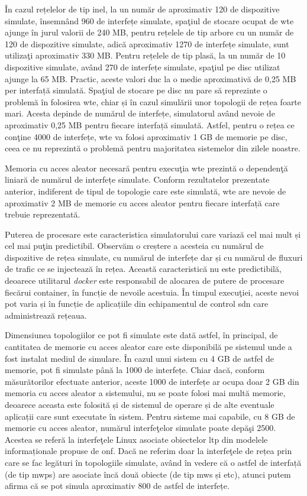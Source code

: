 În cazul rețelelor de tip inel, la un număr de aproximativ 120 de dispozitive simulate, însemnând 960 de interfețe simulate, spaţiul de stocare ocupat de \gls{wte} ajunge în jurul valorii de 240 MB, pentru rețelele de tip arbore cu un număr de 120 de dispozitive simulate, adică aproximativ 1270 de interfețe simulate, sunt utilizaţi aproximativ 330 MB. Pentru rețelele de tip plasă, la un număr de 10 dispozitive simulate, având 270 de interfețe simulate, spaţiul pe disc utilizat ajunge la 65 MB. Practic, aceste valori duc la o medie aproximativă de 0,25 MB per interfață simulată. Spaţiul de stocare pe disc nu pare să reprezinte o problemă în folosirea \gls{wte}, chiar și în cazul simulării unor topologii de rețea foarte mari. Acesta depinde de numărul de interfețe, simulatorul având nevoie de aproximativ 0,25 MB pentru fiecare interfață simulată. Astfel, pentru o rețea ce conţine 4000 de interfețe, \gls{wte} va folosi aproximativ 1 GB de memorie pe disc, ceea ce nu reprezintă o problemă pentru majoritatea sistemelor din zilele noastre.

Memoria cu acces aleator necesară pentru execuţia \gls{wte} prezintă o dependenţă liniară de numărul de interfețe simulate. Conform rezultatelor prezentate anterior, indiferent de tipul de topologie care este simulată, \gls{wte} are nevoie de aproximativ 2 MB de memorie cu acces aleator pentru fiecare interfață care trebuie reprezentată.

Puterea de procesare este caracteristica simulatorului care variază cel mai mult și cel mai puţin predictibil. Observăm o creștere a acesteia cu numărul de dispozitive de rețea simulate, cu numărul de interfețe dar și cu numărul de fluxuri de trafic ce se injectează în rețea. Această caracteristică nu este predictibilă, deoarece utilitarul \textit{docker} este responsabil de alocarea de putere de procesare fiecărui container, în funcție de nevoile acestuia. În timpul execuţiei, aceste nevoi pot varia și în funcție de aplicațiile din echipamentul de control \gls{sdn} care administrează rețeaua.

Dimensiunea topologiilor ce pot fi simulate este dată astfel, în principal, de cantitatea de memorie cu acces aleator care este disponibilă pe sistemul unde a fost instalat mediul de simulare. În cazul unui sistem cu 4 GB de astfel de memorie, pot fi simulate până la 1000 de interfețe. Chiar dacă, conform măsurătorilor efectuate anterior, aceste 1000 de interfețe ar ocupa doar 2 GB din memoria cu acces aleator a sistemului, nu se poate folosi mai multă memorie, deoarece aceasta este folosită și de sistemul de operare și de alte eventuale aplicații care sunt executate în sistem. Pentru sisteme mai capabile, cu 8 GB de memorie cu acces aleator, numărul interfeţelor simulate poate depăşi 2500. Acestea se referă la interfeţele Linux asociate obiectelor \gls{ltp} din modelele informaționale propuse de \gls{onf}. Dacă ne referim doar la interfeţele de rețea prin care se fac legături în topologiile simulate, având în vedere că o astfel de interfață (de tip \gls{mwps}) are asociate încă două obiecte (de tip \gls{mws} și \gls{etc}), atunci putem afirma că se pot simula aproximativ 800 de astfel de interfețe.

